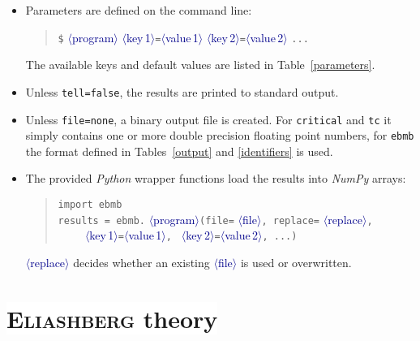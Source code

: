 \documentclass[a4paper]{article}
\def\dummy#1{\textcolor{darkblue}{$\langle$#1$\rangle$}}
\def\headline#1{\section*{%
   \normalsize\normalfont%
   \rlap{\rule[0.5ex]\textwidth{0.4pt}}%
   \qquad\colorbox{white}{#1}%
   }}
\begin{document}
   \begin{itemize}
      \item
         Parameters are defined on the command line:
         \begin{quote}
            \verb|$| \dummy{program}
               \dummy{key\,1}\verb|=|\dummy{value\,1}
               \dummy{key\,2}\verb|=|\dummy{value\,2} \verb|...|
         \end{quote}
         The available keys and default values are listed in
         Table~\ref{parameters}.

      \item
         Unless \texttt{tell=false}, the results are printed to standard output.

      \item
         Unless \texttt{file=none}, a binary output file is created. For
         \texttt{critical} and \texttt{tc} it simply contains one or more double
         precision floating point numbers, for \texttt{ebmb} the format defined
         in Tables~\ref{output} and \ref{identifiers} is used.

      \item
         The provided \emph{Python} wrapper functions load the results into
         \emph{NumPy} arrays:
         \begin{quote}
            \verb|import ebmb| \\
            \verb|results = ebmb.|%
            \dummy{program}\verb|(file=|%
            \dummy{file}\verb|, replace=|%
            \dummy{replace}\verb|,| \\
            \verb|    |%
               \dummy{key\,1}\verb|=|\dummy{value\,1}\verb|, |%
               \dummy{key\,2}\verb|=|\dummy{value\,2}\verb|, ...|\verb|)|
         \end{quote}
         \dummy{replace} decides whether an existing \dummy{file} is used or
         overwritten.
   \end{itemize}

   \headline{\textsc{Eliashberg} theory}
\end{document}
